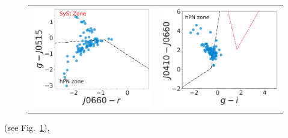 \documentclass[11pt]{article}
\newcommand\raiselabel[1]{\raisebox{0.9\figwidth}[-0.5\figwidth]{#1}}
\begin{document}
\begin{figure}
\begin{tabular}{l l}
\includegraphics[width=0.5\linewidth, trim=10 10 10 10, clip]{figs-pca/Fig4-PN-pc-Halpha_emitters_threeerror-cleaning-limfilter-limcolor-flags-mask-broad-g.pdf} & \includegraphics[width=0.5\linewidth, trim=10 10 10 10, clip]{figs-pca/Fig5-PN-pc-Halpha_emitters_threeerror-cleaning-limfilter-limcolor-flags-mask-broad-gi.pdf} \\
\end{tabular}
\caption{}
\label{fig:smppne}
\end{figure}

 (see Fig.~\ref{fig:smppne}),


\newpage
\begin{longtable}{ccc}
  
\end{longtable}


\newpage
\begin{longtable}{ccc}
  
\end{longtable}
\end{document}

